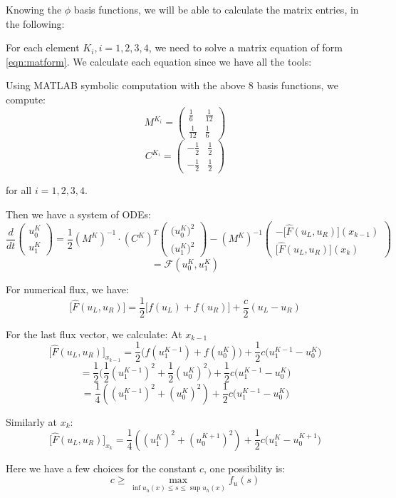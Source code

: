 \documentclass[12pt]{article} %
\newcommand{\1}[1]{\mathds{1}\left[#1\right]}
\begin{document}
Knowing the $\phi$ basis functions, we will be able to calculate the matrix entries, in the following:

For each element $K_i, i=1,2,3,4$, we need to solve a matrix equation of form \ref{eqn:matform}. We calculate each equation since we have all the tools:

Using MATLAB symbolic computation with the above 8 basis functions, we compute:
$$
	M^{K_i} = 
	\begin{pmatrix}
		\frac16 & \frac{1}{12}\\
		\frac{1}{12} & \frac16
	\end{pmatrix}
$$ 
$$
	C^{K_i} = 
	\begin{pmatrix}
		-\frac12 & \frac{1}{2}\\
		-\frac{1}{2} & \frac12
	\end{pmatrix}
$$

for all $i = 1,2,3,4$.

Then we have a system of ODEs:
$$
	\frac{d}{dt}
	\begin{pmatrix}
		u_0^K \\
		u_1^K
	\end{pmatrix} =
	\frac12(M^K)^{-1}\cdot(C^K)^T 
	\begin{pmatrix}
		\big(u_0^K\big)^2 \\
		\big(u_1^K\big)^2
	\end{pmatrix}
	-
	(M^K)^{-1}
	\begin{pmatrix}
		-\big[\hat{F}(u_L,u_R)\big](x_{k-1}) \\
		\big[\hat{F}(u_L,u_R)\big](x_{k})
	\end{pmatrix}
$$
$$
	= \mathcal{F}(u_0^K, u_1^K)
$$

For numerical flux, we have:
$$
	\bigg[\hat{F}(u_L, u_R)\bigg]
	=
	\frac12\bigg[f(u_L) +f(u_R)\bigg]+\frac{c}{2}(u_L-u_R)
$$

For the last flux vector, we calculate:
At $x_{k-1}$
$$
	\big[\hat{F}(u_L,u_R)\big]_{x_{k-1}}
	=
	\frac12\big(f(u_{1}^{K-1})+f(u_{0}^{K})\big) + \frac12c\big(u_1^{K-1} - u_0^K\big)
$$
$$
	= \frac12\big(\frac12(u_{1}^{K-1})^2+\frac12(u_{0}^{K})^2\big) + \frac12c\big(u_1^{K-1} - u_0^K\big)
$$
$$
	= \frac14((u_{1}^{K-1})^2 + (u_{0}^{K})^2) + \frac12c\big(u_1^{K-1} - u_0^K\big)
$$

Similarly at $x_k$:
$$
	\big[\hat{F}(u_L,u_R)\big]_{x_{k}}
	=
	\frac14((u_{1}^{K})^2 + (u_{0}^{K+1})^2) + \frac12c\big(u_1^{K} - u_0^{K+1}\big)
$$

Here we have a few choices for the constant $c$, one possibility is:
$$
	c\ge \max_{\inf u_h(x)\le s\le \sup u_h(x)}f_u(s)
$$
\end{document}

